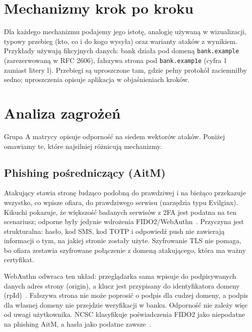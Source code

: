 \documentclass[11pt,a4paper]{article}
\begin{document}
\section{Mechanizmy krok po kroku}\label{sec:mechanizmy}

Dla każdego mechanizmu podajemy jego istotę, analogię używaną w wizualizacji, typowy przebieg (kto, co i do kogo wysyła) oraz warianty ataków z wynikiem. Przykłady używają fikcyjnych danych: bank działa pod domeną \texttt{bank.example} (zarezerwowaną w RFC 2606), fałszywa strona pod \texttt{bank.examp1e} (cyfra 1 zamiast litery l). Przebiegi są uproszczone tam, gdzie pełny protokół zaciemniłby sedno; uproszczenia opisuje aplikacja w objaśnieniach kroków.



\section{Analiza zagrożeń}\label{sec:zagrozenia}

Grupa A matrycy opisuje odporność na siedem wektorów ataków. Poniżej omawiamy te, które najsilniej różnicują mechanizmy.

\subsection{Phishing pośredniczący (AitM)}
Atakujący stawia stronę łudząco podobną do prawdziwej i na bieżąco przekazuje wszystko, co wpisze ofiara, do prawdziwego serwisu (narzędzia typu Evilginx). Kikuchi pokazuje, że większość badanych serwisów z 2FA jest podatna na ten scenariusz; odporne były jedynie wdrożenia FIDO2/WebAuthn~\cite{A1}. Przyczyna jest strukturalna: hasło, kod SMS, kod TOTP i odpowiedź push nie zawierają informacji o tym, na jakiej stronie zostały użyte. Szyfrowanie TLS nie pomaga, bo ofiara zestawia szyfrowane połączenie z domeną atakującego, która ma ważny certyfikat.

WebAuthn odwraca ten układ: przeglądarka sama wpisuje do podpisywanych danych adres strony (origin), a klucz jest przypisany do identyfikatora domeny (rpId)~\cite{S1}. Fałszywa strona nie może poprosić o podpis dla cudzej domeny, a podpis dla własnej domeny nie przejdzie weryfikacji w banku. Odporność nie zależy więc od uwagi użytkownika. NCSC klasyfikuje poświadczenia FIDO2 jako niepodatne na phishing AitM, a hasła jako podatne zawsze~\cite{P6}.
\end{document}
